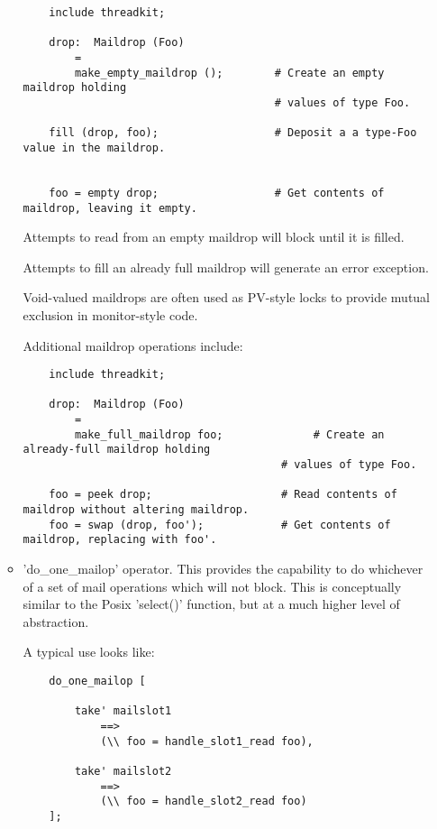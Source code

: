 \begin{itemize}
\begin{itemize}
\begin{verbatim}
    include threadkit;

    drop:  Maildrop (Foo)
        =
        make_empty_maildrop ();        # Create an empty maildrop holding
                                       # values of type Foo.

    fill (drop, foo);                  # Deposit a a type-Foo value in the maildrop.


    foo = empty drop;                  # Get contents of maildrop, leaving it empty.
\end{verbatim}

Attempts to read from an empty maildrop will 
block until it is filled.

Attempts to fill an already full maildrop 
will generate an error exception.

Void-valued maildrops are often used as 
PV-style locks to provide mutual exclusion 
in monitor-style code.

Additional maildrop operations include:

\begin{verbatim}
    include threadkit;

    drop:  Maildrop (Foo)
        =
        make_full_maildrop foo;              # Create an already-full maildrop holding
                                        # values of type Foo.

    foo = peek drop;                    # Read contents of maildrop without altering maildrop.
    foo = swap (drop, foo');            # Get contents of maildrop, replacing with foo'.
\end{verbatim}

\item 
'do\_one\_mailop' operator.  This provides the 
capability to do whichever of a set of 
mail operations which will not block. 
This is conceptually similar to the Posix 
'select()' function, but at a much higher 
level of abstraction.

A typical use looks like:

\begin{verbatim}
    do_one_mailop [

        take' mailslot1
            ==>
            (\\ foo = handle_slot1_read foo),

        take' mailslot2
            ==>
            (\\ foo = handle_slot2_read foo)
    ];
\end{verbatim}


\end{itemize}
\end{itemize}

